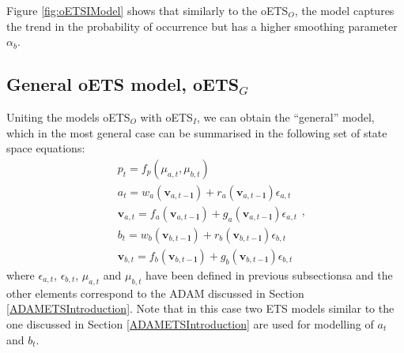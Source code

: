 \documentclass[
]{book}
\theoremstyle{definition}
\theoremstyle{definition}
\theoremstyle{definition}
\theoremstyle{definition}
\theoremstyle{remark}
\begin{document}
Figure \ref{fig:oETSIModel} shows that similarly to the oETS\(_O\), the model captures the trend in the probability of occurrence but has a higher smoothing parameter \(\alpha_b\).

\hypertarget{oETSG}{%
\subsection{\texorpdfstring{General oETS model, oETS\(_G\)}{General oETS model, oETS\_G}}\label{oETSG}}

Uniting the models oETS\(_O\) with oETS\(_I\), we can obtain the ``general'' model, which in the most general case can be summarised in the following set of state space equations:
\begin{equation}
\begin{aligned}
& p_t = f_p(\mu_{a,t}, \mu_{b,t}) \\
& a_t = w_a(\mathbf{v}_{a,t-\mathbf{l}}) + r_a(\mathbf{v}_{a,t-\mathbf{l}}) \epsilon_{a,t} \\
& \mathbf{v}_{a,t} = f_a(\mathbf{v}_{a,t-\mathbf{l}}) + g_a(\mathbf{v}_{a,t-\mathbf{l}}) \epsilon_{a,t} \\
& b_t = w_b(\mathbf{v}_{b,t-\mathbf{l}}) + r_b(\mathbf{v}_{b,t-\mathbf{l}}) \epsilon_{b,t} \\
& \mathbf{v}_{b,t} = f_b(\mathbf{v}_{b,t-\mathbf{l}}) + g_b(\mathbf{v}_{b,t-\mathbf{l}}) \epsilon_{b,t}
\end{aligned} ,
\label{eq:oETSG}
\end{equation}
where \(\epsilon_{a,t}\), \(\epsilon_{b,t}\), \(\mu_{a,t}\) and \(\mu_{b,t}\) have been defined in previous subsectionsa and the other elements correspond to the ADAM discussed in Section \ref{ADAMETSIntroduction}. Note that in this case two ETS models similar to the one discussed in Section \ref{ADAMETSIntroduction} are used for modelling of \(a_t\) and \(b_t\).
\end{document}
